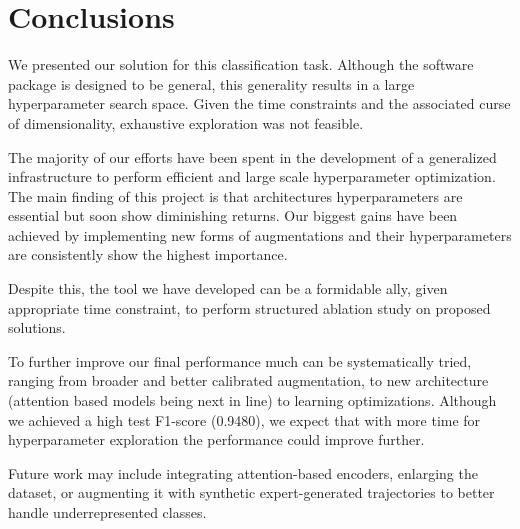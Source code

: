 
\section{Conclusions}
\vspace{-10pt}
We presented our solution for this classification task. 
Although the software package is designed to be general, this generality results in a large hyperparameter search space. Given the time constraints and the associated curse of dimensionality, exhaustive exploration was not feasible.

The majority of our efforts have been spent in the development of a generalized infrastructure to perform efficient and large scale hyperparameter optimization. The main finding of this project is that architectures hyperparameters are essential but soon show diminishing returns. Our biggest gains have been achieved by implementing new forms of augmentations and their hyperparameters are consistently show the highest importance. 

Despite this, the tool we have developed can be a formidable ally, given appropriate time constraint, to perform structured ablation study on proposed solutions.

To further improve our final performance much can be systematically tried, ranging from broader and better calibrated augmentation, to new architecture (attention based models being next in line) to learning optimizations.
Although we achieved a high test F1-score (0.9480), we expect that with more time for hyperparameter exploration the performance could improve further.

Future work may include integrating attention-based encoders, enlarging the dataset, or augmenting it with synthetic expert-generated trajectories to better handle underrepresented classes.






